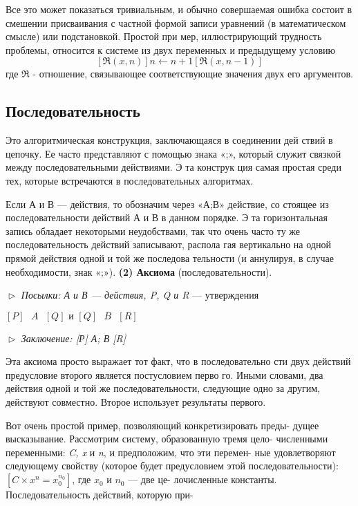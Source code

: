 \parindent=1cm Все  это  может  показаться  тривиальным,  и  обычно  совершаемая 
ошибка  состоит  в  смешении  присваивания с  частной  формой  записи 
уравнений (в математическом смысле)  или подстановкой. Простой при­
мер,  иллюстрирующий  трудность  проблемы,  относится  к  системе  из 
двух переменных  и  предыдущему  условию
\begin{equation*}
\textit{$[\Re(x,n)] n \leftarrow n + 1 [\Re(x,n - 1)]$}
	\end{equation*}
где $\Re$ - отношение,  связывающее соответствующие значения двух его 
аргументов.
\subsection{Последовательность}
\noindent Это  алгоритмическая конструкция,  заключающаяся  в соединении  дей­
ствий  в цепочку.  Ее часто представляют с помощью знака «;», который 
служит связкой  между  последовательными  действиями.  Э та конструк­
ция самая простая среди тех, которые встречаются в последовательных 
алгоритмах.

\parindent=1cm Если А и В — действия,  то обозначим  через  «А;В» действие, со­
стоящее из последовательности действий А и В в данном порядке. Э та 
горизонтальная запись обладает некоторыми неудобствами, так что 
очень часто ту же последовательность действий записывают, распола­
гая вертикально на одной прямой действия одной и той же последова­
тельности (и аннулируя, в случае необходимости, знак «;»).
\newline
\textbf{(2) Аксиома} (последовательности).
\newline

\noindent $\vartriangleright$ \textit{Посылки: А и В --- действия, P, Q и R} --- утверждения
\begin{center}
\textit{$[ P ]\textit{ }A\textit{ }[ Q ]  \text{ и } [Q]\textit{ }B\textit{ }[ R ]$}
\end{center}
\pagebreak
$\vartriangleright$ \textit{Заключение:  [Р] А; В [R]}
\newline

\parindent=1cm Эта  аксиома  просто  выражает  тот  факт,  что  в  последовательно­
сти двух действий  предусловие  второго является  постусловием  перво­
го. Иными словами, два действия одной и той же последовательности, 
следующие  одно за другим,  действуют  совместно.  Второе  использует 
результаты первого.

\parindent=1cm Вот очень простой пример, позволяющий конкретизировать преды-\linebreak
дущее  высказывание.  Рассмотрим систему,  образованную тремя цело­-\linebreak
численными переменными: \textit{C, x} и \textit{n}, и предположим, что эти перемен­-\linebreak
ные удовлетворяют следующему свойству (которое будет предусловием \linebreak
этой последовательности):\textit{$[C\times x^{n} = x_{0}^{n_{0}}]$}, где \textit{$x_{0}$} и \textit{$n_{0}$} --- две це-\linebreak
лочисленные константы. Последовательность действий, которую при­-


